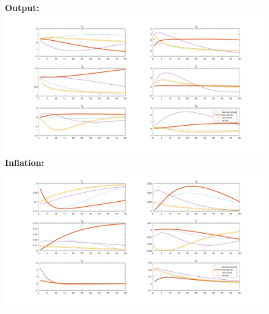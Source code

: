\documentclass[12pt,reqno]{article}
\numberwithin{equation}{section}
\begin{document}
\begin{figure}[H]
\textbf{Output:}\\
\includegraphics[scale=0.5]{AR1_impresp_output_riseComp.pdf}
\textbf{Inflation:}\\
\includegraphics[scale=0.5]{AR1_impresp_pinf_riseComp.pdf}

\end{figure}
\end{document}
